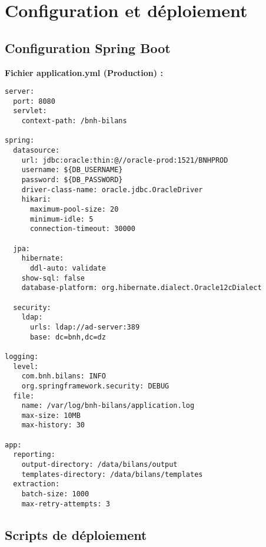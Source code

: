 \section{Configuration et déploiement}

\subsection{Configuration Spring Boot}

\textbf{Fichier application.yml (Production) :}
\begin{verbatim}
server:
  port: 8080
  servlet:
    context-path: /bnh-bilans
    
spring:
  datasource:
    url: jdbc:oracle:thin:@//oracle-prod:1521/BNHPROD
    username: ${DB_USERNAME}
    password: ${DB_PASSWORD}
    driver-class-name: oracle.jdbc.OracleDriver
    hikari:
      maximum-pool-size: 20
      minimum-idle: 5
      connection-timeout: 30000
      
  jpa:
    hibernate:
      ddl-auto: validate
    show-sql: false
    database-platform: org.hibernate.dialect.Oracle12cDialect
    
  security:
    ldap:
      urls: ldap://ad-server:389
      base: dc=bnh,dc=dz
      
logging:
  level:
    com.bnh.bilans: INFO
    org.springframework.security: DEBUG
  file:
    name: /var/log/bnh-bilans/application.log
    max-size: 10MB
    max-history: 30

app:
  reporting:
    output-directory: /data/bilans/output
    templates-directory: /data/bilans/templates
  extraction:
    batch-size: 1000
    max-retry-attempts: 3
\end{verbatim}

\subsection{Scripts de déploiement}

